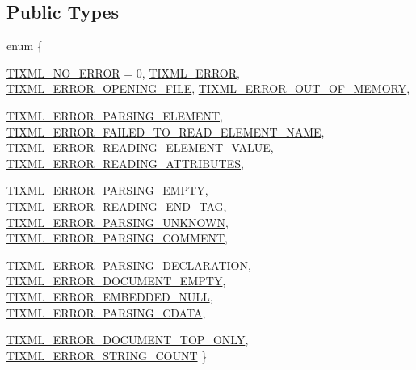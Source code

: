 \subsection*{Public Types}
\begin{DoxyCompactItemize}
\item 
enum \{ \par
\hyperlink{class_ti_xml_base_a4b788e6990f18d930cc68e38587f05cda750a76ca602241c416d5ec357d55fba1}{TIXML\_\-NO\_\-ERROR} =  0, 
\hyperlink{class_ti_xml_base_a4b788e6990f18d930cc68e38587f05cdabcabc1b8efabeda1cc4352aa73d64390}{TIXML\_\-ERROR}, 
\hyperlink{class_ti_xml_base_a4b788e6990f18d930cc68e38587f05cdab803949b8f12e03b5b57f86d9c52b614}{TIXML\_\-ERROR\_\-OPENING\_\-FILE}, 
\hyperlink{class_ti_xml_base_a4b788e6990f18d930cc68e38587f05cda92e3bfc96126d3544f47e8b3f031e7bb}{TIXML\_\-ERROR\_\-OUT\_\-OF\_\-MEMORY}, 
\par
\hyperlink{class_ti_xml_base_a4b788e6990f18d930cc68e38587f05cda5cbfcf7fe5e67f0cd1aef98deac55dd2}{TIXML\_\-ERROR\_\-PARSING\_\-ELEMENT}, 
\hyperlink{class_ti_xml_base_a4b788e6990f18d930cc68e38587f05cdadcc31ca78a9d507a88c9fafb3d18a3c4}{TIXML\_\-ERROR\_\-FAILED\_\-TO\_\-READ\_\-ELEMENT\_\-NAME}, 
\hyperlink{class_ti_xml_base_a4b788e6990f18d930cc68e38587f05cdafefdc75db23215e846605a2b5af0c2d3}{TIXML\_\-ERROR\_\-READING\_\-ELEMENT\_\-VALUE}, 
\hyperlink{class_ti_xml_base_a4b788e6990f18d930cc68e38587f05cda670fac23171b64829f90639cc3696d6e}{TIXML\_\-ERROR\_\-READING\_\-ATTRIBUTES}, 
\par
\hyperlink{class_ti_xml_base_a4b788e6990f18d930cc68e38587f05cda5f2aee664733a20f13f6f77556b9fa85}{TIXML\_\-ERROR\_\-PARSING\_\-EMPTY}, 
\hyperlink{class_ti_xml_base_a4b788e6990f18d930cc68e38587f05cda175f7c72e2f9630bb96ef5137b325502}{TIXML\_\-ERROR\_\-READING\_\-END\_\-TAG}, 
\hyperlink{class_ti_xml_base_a4b788e6990f18d930cc68e38587f05cda24c814fdcf1d84704869e6f76b19cb6e}{TIXML\_\-ERROR\_\-PARSING\_\-UNKNOWN}, 
\hyperlink{class_ti_xml_base_a4b788e6990f18d930cc68e38587f05cda72e3072a44be499edb89593f6ce10f6c}{TIXML\_\-ERROR\_\-PARSING\_\-COMMENT}, 
\par
\hyperlink{class_ti_xml_base_a4b788e6990f18d930cc68e38587f05cda4c200f9d125027ab449e2be7be471ba0}{TIXML\_\-ERROR\_\-PARSING\_\-DECLARATION}, 
\hyperlink{class_ti_xml_base_a4b788e6990f18d930cc68e38587f05cdab345f3e42e6ae9cdedee2b95e4d461b9}{TIXML\_\-ERROR\_\-DOCUMENT\_\-EMPTY}, 
\hyperlink{class_ti_xml_base_a4b788e6990f18d930cc68e38587f05cdade7edbad3a94a6c161cac2638f380e17}{TIXML\_\-ERROR\_\-EMBEDDED\_\-NULL}, 
\hyperlink{class_ti_xml_base_a4b788e6990f18d930cc68e38587f05cdaab2c858631b5d38eae1e6675949b9cd4}{TIXML\_\-ERROR\_\-PARSING\_\-CDATA}, 
\par
\hyperlink{class_ti_xml_base_a4b788e6990f18d930cc68e38587f05cda679b15d950f29257700a724bb118c34d}{TIXML\_\-ERROR\_\-DOCUMENT\_\-TOP\_\-ONLY}, 
\hyperlink{class_ti_xml_base_a4b788e6990f18d930cc68e38587f05cda14552894942250efcec6b00dc52fc48a}{TIXML\_\-ERROR\_\-STRING\_\-COUNT}
 \}
\end{DoxyCompactItemize}
